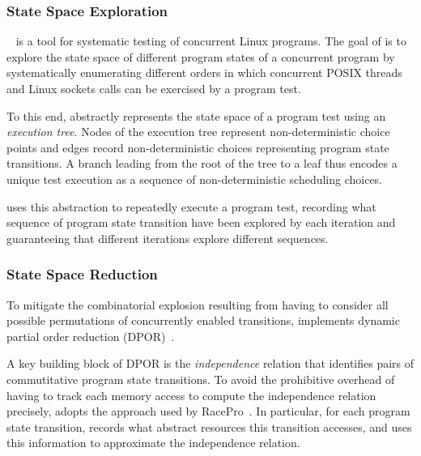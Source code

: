 \subsubsection{State Space Exploration}
\dbug~\cite{dbug:spin11} is a tool for systematic testing of concurrent
Linux programs. The goal of \dbug is to explore the state space of
different program states of a concurrent program by systematically
enumerating different orders in which concurrent POSIX threads and
Linux sockets calls can be exercised by a program test.

To this end, \dbug abstractly represents the state space of a program
test using an \emph{execution tree}. Nodes of the execution tree
represent non-deterministic choice points and edges record
non-deterministic choices representing program state transitions. A
branch leading from the root of the tree to a leaf thus encodes a
unique test execution as a sequence of non-deterministic scheduling
choices.

\dbug uses this abstraction to repeatedly execute a program test,
recording what sequence of program state transition have been explored
by each iteration and guaranteeing that different iterations explore
different sequences.

\subsubsection{State Space Reduction}
To mitigate the combinatorial explosion resulting from having to
consider all possible permutations of concurrently enabled
transitions, \dbug implements dynamic partial order
reduction (DPOR)~\cite{flanagan:dynamicpo}.

A key building block of DPOR is the \emph{independence} relation that
identifies pairs of commutitative program state transitions. To avoid
the prohibitive overhead of having to track each memory access to
compute the independence relation precisely, \dbug adopts the approach
used by RacePro~\cite{racepro:sosp11}. In particular, for each program state
transition, \dbug records what abstract resources this transition
accesses, and uses this information to approximate the independence
relation.


